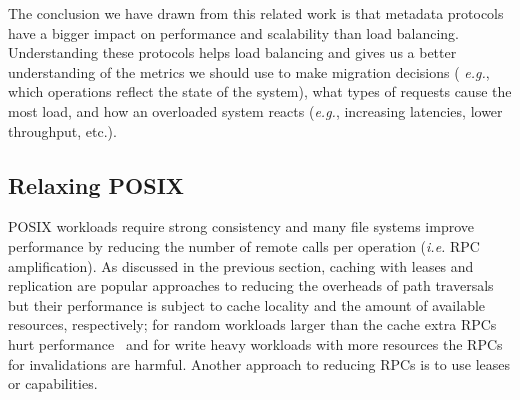 \documentclass[preprint]{sigplanconf-eurosys}
\begin{document}

The conclusion we have drawn from this related work is that metadata protocols
have a bigger impact on performance and scalability than load balancing.  
Understanding these protocols helps load balancing and gives us a better
understanding of the metrics we should use to make migration decisions ({\it
e.g.}, which operations reflect the state of the system), what types of
requests cause the most load, and how an overloaded system reacts ({\it e.g.},
increasing latencies, lower throughput, etc.).

\subsection{Relaxing POSIX}

POSIX workloads require strong consistency and many file systems improve
performance by reducing the number of remote calls per operation ({\it i.e.}
RPC amplification). As discussed in the previous section, caching with leases and
replication are popular approaches to reducing the overheads of path traversals
but their performance is subject to cache locality and the amount of available
resources, respectively; for random workloads larger than the cache extra RPCs
hurt performance~\cite{IndexFS, CephFS} and for write heavy workloads with more
resources the RPCs for invalidations are harmful. Another approach to reducing
RPCs is to use leases or capabilities.  


\end{document}
